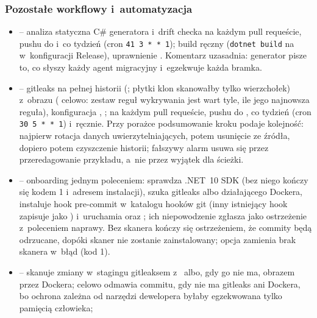 \subsubsection{Pozostałe workflowy i~automatyzacja}

\begin{itemize}
  \item {} -- analiza statyczna C\# generatora i~drift checka na każdym pull
        requeście, pushu do  i~co tydzień (cron \texttt{41 3 * * 1}); build
        ręczny (\texttt{dotnet build} na  w~konfiguracji Release),
        uprawnienie . Komentarz uzasadnia: generator pisze to,
        co słyszy każdy agent migracyjny i~egzekwuje każda bramka.
  \item {} -- gitleaks na pełnej historii (; płytki
        klon skanowałby tylko wierzchołek) z~obrazu 
        ( celowo: zestaw reguł wykrywania jest wart tyle, ile jego najnowsza
        reguła), konfiguracja , ; na każdym pull
        requeście, pushu do , co tydzień (cron \texttt{30 5 * * 1}) i~ręcznie.
        Przy porażce podsumowanie kroku podaje kolejność: najpierw rotacja danych
        uwierzytelniających, potem usunięcie ze źródła, dopiero potem czyszczenie historii;
        fałszywy alarm usuwa się przez przeredagowanie przykładu, a~nie przez wyjątek dla
        ścieżki.
  \item {} -- onboarding jednym poleceniem: sprawdza .NET~10 SDK (bez
        niego kończy się kodem 1 i~adresem instalacji), szuka gitleaks albo działającego
        Dockera, instaluje hook pre-commit w~katalogu hooków git (inny istniejący hook
        zapisuje jako ) i~uruchamia  oraz
        ; ich niepowodzenie zgłasza jako ostrzeżenie
        z~poleceniem naprawy. Bez skanera kończy się ostrzeżeniem, że commity będą
        odrzucane, dopóki skaner nie zostanie zainstalowany; opcja 
        zamienia brak skanera w~błąd (kod 1).
  \item {} -- skanuje zmiany w~stagingu gitleaksem
        z~ albo, gdy go nie ma, obrazem 
        przez Dockera; celowo odmawia commitu, gdy nie ma gitleaks ani Dockera, bo ochrona
        zależna od narzędzi dewelopera byłaby egzekwowana tylko pamięcią człowieka;

\end{itemize}
